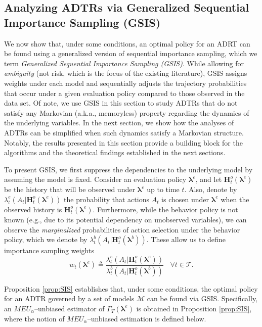 \documentclass[opre,nonblindrev]{informs2}%
\newcommand{\teq}{\triangleq}
\newcommand{\1}{\hbox{\rm 1\kern-.35em 1}}
\newcommand{\MT}{\mathscr T}
\newcommand{\MM}{\mathscr M}
\newcommand{\blambda}{\boldsymbol{\lambda}}
\newcommand{\bH}{\mathbf{H}}
\begin{document}
\subsection{Analyzing ADTRs via Generalized Sequential Importance Sampling (GSIS)}
We now show that, under some conditions, an optimal policy for an ADRT can be found using  a generalized version of sequential importance sampling, which we term  {\em Generalized Sequential Importance Sampling (GSIS)}. While allowing for {\em ambiguity} (not risk, which is the focus of the existing literature), GSIS assigns weights under each model and sequentially adjusts the trajectory probabilities that occur under a given evaluation policy compared to those observed in the data set. Of note, we use GSIS in this section to study ADTRs that do not satisfy any Markovian (a.k.a., memoryless) property regarding the dynamics of the underlying variables. In the next section, we show how the analyses of ADTRs can be simplified when such dynamics satisfy a Markovian structure. Notably, the results presented in this section provide a building block for the algorithms and the theoretical findings established in the next sections.





To present GSIS, we first suppress the dependencies to the underlying model by assuming the model is fixed. Consider an evaluation policy $\blambda^e$,  and let $\bH^o_t (\blambda^e)$ be the history that will be observed under $\blambda^e$ up to time $t$. Also, denote by $\lambda_t^e(A_t|\bH^o_t (\blambda^e))$ the probability that actions $A_t$ is chosen under $\blambda^e$ when the observed history is $\bH^o_t (\blambda^e)$. Furthermore,  while the behavior policy is not known (e.g., due to its potential dependency on unobserved variables), we can observe the {\em marginalized} probabilities of action selection under the behavior policy, which we denote by $\lambda_t^b(A_t|\bH^o_t (\blambda^b))$. These allow us to define importance sampling weights
\begin{equation}\label{eq:W}
w_t (\blambda^e)\teq \frac{\lambda_t^e(A_t|\bH^o_t (\blambda^e))}{\lambda_t^b(A_t|\bH^o_t (\blambda^b))} \ \ \ \ \forall t\in\MT.
\end{equation}

Proposition \ref{prop:SIS}  establishes that, under some conditions, the optimal policy for an ADTR governed by a set of models $\MM$ can be found via GSIS. Specifically,  an $MEU_\alpha$--unbiased estimator of  $\Gamma_T(\blambda^e)$ is obtained in Proposition \ref{prop:SIS}, where the notion of $MEU_\alpha$--unbiased estimation is defined below.
\end{document}
